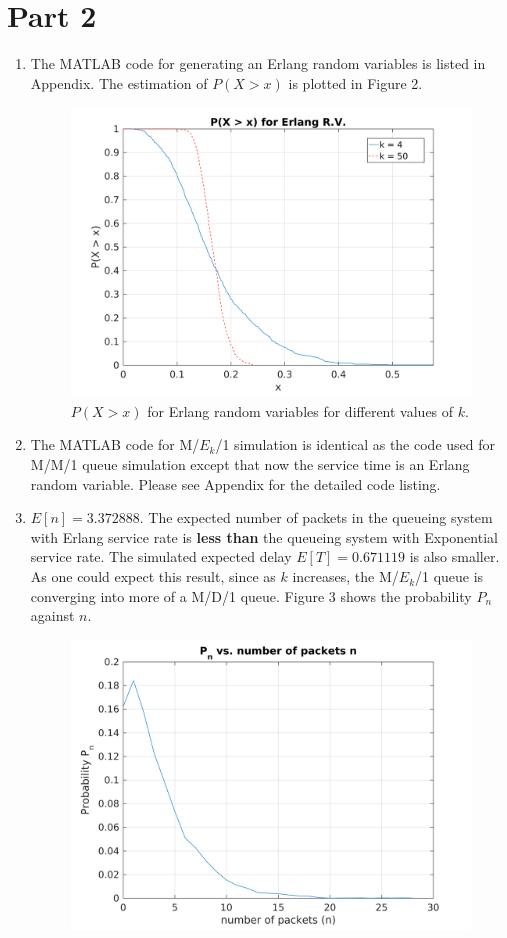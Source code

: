 \documentclass{article}
\begin{document}
\section*{Part 2}
	\begin{enumerate}
		\item The MATLAB code for generating an Erlang random variables is listed in
			Appendix. The estimation of $P(X > x)$ is plotted in Figure 2.
			\begin{figure}[!hbt]
				\centering
				\includegraphics[width=0.8\linewidth]{proj1_p2_px.png}
				\caption{$P(X > x)$ for Erlang random variables for different values of $k$.}
			\end{figure}
		\item The MATLAB code for M/$E_k$/1 simulation is identical as the code used
			for M/M/1 queue simulation except that now the service time is an Erlang
			random variable. Please see Appendix for the detailed code listing.
		\item $E[n] = 3.372888$. The expected number of packets in the queueing
			system with Erlang service rate is \textbf{less than} the queueing system
			with Exponential service rate. The simulated expected delay $E[T] = 0.671119$
			is also smaller. As one could expect this result, since as $k$ increases,
			the M/$E_k$/1 queue is converging into more of a M/D/1 queue. Figure 3
			shows the probability $P_n$ against $n$.
			\begin{figure}[!hbt]
				\centering
				\includegraphics[width=0.8\linewidth]{proj1_p2_pn_vs_n.png}

\end{figure}
\end{enumerate}
\end{document}
